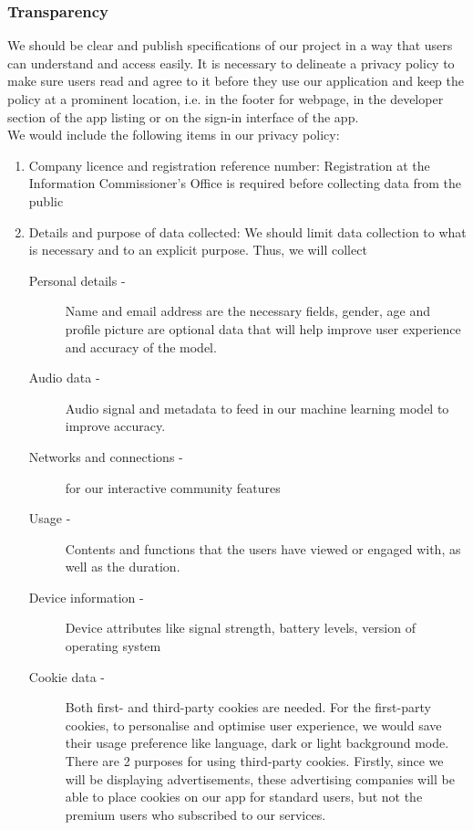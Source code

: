 \subsubsection{Transparency}
We should be clear and publish specifications of our project in a way that users can understand and access
easily. It is necessary to delineate a privacy policy to make sure users read and agree to it before they use
our application and keep the policy at a prominent location, i.e. in the footer for webpage, in the developer
section of the app listing or on the sign-in interface of the app.\\We would include the following items in our privacy policy:
\begin{enumerate}
    \item Company licence and registration reference number: Registration at the Information Commissioner's Office is required
    before collecting data from the public
    \item Details and purpose of data collected: We should limit data collection to what is necessary and to an explicit purpose.
    Thus, we will collect
    \begin{description}
        \item[Personal details -] Name and email address are the necessary fields, gender, age and profile picture are optional data
        that will help improve user experience and accuracy of the model. 
        \item[Audio data -] Audio signal and metadata to feed in our machine learning model to improve accuracy.
        \item[Networks and connections -] for our interactive community features
        \item[Usage -] Contents and functions that the users have viewed or engaged with, as well as the duration.
        \item[Device information -] Device attributes like signal strength, battery levels, version of operating system
        \item[Cookie data -] Both first- and third-party cookies are needed. For the first-party cookies, to personalise and optimise user
        experience, we would save their usage preference like language, dark or light background mode. 
        \\There are 2 purposes for using third-party cookies. Firstly, since we will be displaying advertisements, 
        these advertising companies will be able to place cookies on our app for standard users, but not the premium users who subscribed to our services. 

\end{description}
\end{enumerate}
